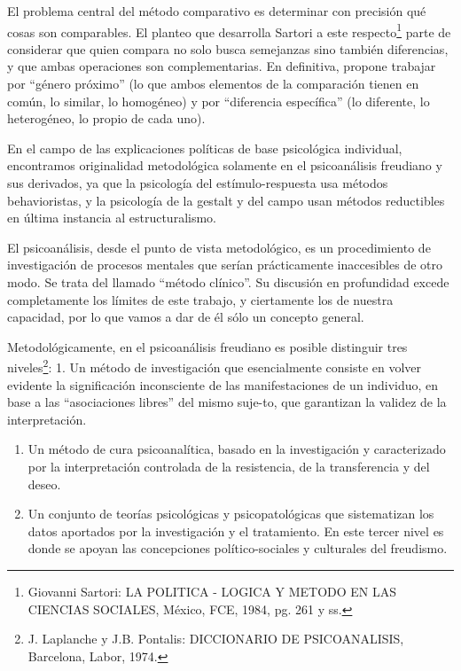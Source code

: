 \documentclass[
]{book}
\begin{document}
El problema central del método comparativo es determinar con precisión qué cosas son comparables. El planteo que desarrolla Sartori a este respecto\footnote{Giovanni Sartori: LA POLITICA - LOGICA Y METODO EN LAS CIENCIAS SOCIALES, México, FCE, 1984, pg. 261 y ss.} parte de considerar que quien compara no solo busca semejanzas sino también diferencias, y que ambas operaciones son complementarias. En definitiva, propone trabajar por ``género próximo'' (lo que ambos elementos de la comparación tienen en común, lo similar, lo homogéneo) y por ``diferencia específica'' (lo diferente, lo heterogéneo, lo propio de cada uno).

En el campo de las explicaciones políticas de base psicológica individual, encontramos originalidad metodológica solamente en el psicoanálisis freudiano y sus derivados, ya que la psicología del estímulo-respuesta usa métodos behavioristas, y la psicología de la gestalt y del campo usan métodos reductibles en última instancia al estructuralismo.

El psicoanálisis, desde el punto de vista metodológico, es un procedimiento de investigación de procesos mentales que serían prácticamente inaccesibles de otro modo. Se trata del llamado ``método clínico''. Su discusión en profundidad excede completamente los límites de este trabajo, y ciertamente los de nuestra capacidad, por lo que vamos a dar de él sólo un concepto general.

Metodológicamente, en el psicoanálisis freudiano es posible distinguir tres niveles\footnote{J. Laplanche y J.B. Pontalis: DICCIONARIO DE PSICOANALISIS, Barcelona, Labor, 1974.}: 1. Un método de investigación que esencialmente consiste en volver evidente la significación inconsciente de las manifestaciones de un individuo, en base a las ``asociaciones libres'' del mismo suje-to, que garantizan la validez de la interpretación.

\begin{enumerate}
\def\labelenumi{\arabic{enumi}.}
\setcounter{enumi}{1}
\item
  Un método de cura psicoanalítica, basado en la investigación y caracterizado por la interpretación controlada de la resistencia, de la transferencia y del deseo.
\item
  Un conjunto de teorías psicológicas y psicopatológicas que sistematizan los datos aportados por la investigación y el tratamiento. En este tercer nivel es donde se apoyan las concepciones político-sociales y culturales del freudismo.
\end{enumerate}
\end{document}
